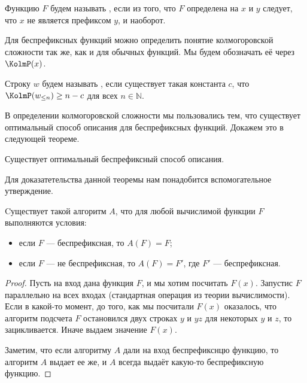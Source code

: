 \begin{definition}
    Функцию $F$ будем называть , если из того, что $F$ определена на $x$ и $y$
    следует, что $x$ не является префиксом $y$, и наоборот.
\end{definition}

Для беспрефиксных функций можно определить понятие колмогоровской сложности так же, как и для обычных
функций. Мы будем обозначать её через $\KolmP(x)$.

\begin{definition}
   Строку $w$ будем называть , если существует такая константа $c$, что
   $\KolmP(w_{\leq n}) \ge n - c$ для всех $n \in \mathbb{N}$.
\end{definition}

В определении колмогоровской сложности мы пользовались тем, что существует оптимальный способ описания
для беспрефиксных функций. Докажем это в следующей теореме.

\begin{theorem}
    Существует оптимальный беспрефиксный способ описания.
\end{theorem}

Для доказатетельства данной теоремы нам понадобится вспомогательное утверждение.

\begin{theorem}
    Cуществует такой алгоритм $A$, что для любой вычислимой функции $F$ выполняются условия:
    \begin{itemize}
        \item если $ F $ --- беспрефиксная, то $ A(F) = F $;
        \item если $ F $ --- не беспрефиксная, то $ A(F) = F' $, где $F'$ --- беспрефиксная.
    \end{itemize}
\end{theorem}

\begin{proof}
    Пусть на вход дана функция $F$, и мы хотим посчитать $F(x)$. Запустис $F$ параллельно на всех входах
    (стандартная операция из теории вычислимости). Если в какой-то момент, до того, как мы посчитали
    $F(x)$ оказалось, что алгоритм подсчета $F$ остановился двух строках $y$ и $yz$ для некоторых $y$ и
    $z$, то зацикливается. Иначе выдаем значение $F(x)$.

    Заметим, что если алгоритму $A$ дали на вход беспрефикснцю функцию, то алгоритм $A$ выдает ее же, и
    $A$ всегда выдаёт какую-то беспрефиксную функцию.
\end{proof}

